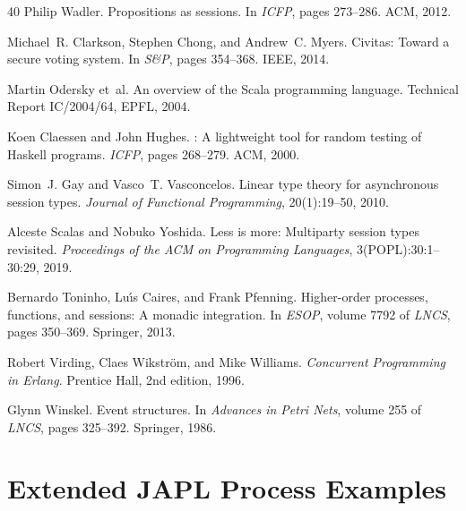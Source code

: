 \documentclass[11pt,a4paper]{article}
\begin{document}
\begin{thebibliography}{40}
Philip Wadler.
\newblock Propositions as sessions.
\newblock In \emph{ICFP}, pages 273--286. ACM, 2012.

Michael~R. Clarkson, Stephen Chong, and Andrew~C. Myers.
\newblock Civitas: Toward a secure voting system.
\newblock In \emph{S\&P}, pages 354--368. IEEE, 2014.

Martin Odersky et~al.
\newblock An overview of the {Scala} programming language.
\newblock Technical Report IC/2004/64, EPFL, 2004.

Koen Claessen and John Hughes.
: A lightweight tool for random testing of {Haskell} programs.
\newblock \emph{ICFP}, pages 268--279. ACM, 2000.

Simon~J. Gay and Vasco~T. Vasconcelos.
\newblock Linear type theory for asynchronous session types.
\newblock \emph{Journal of Functional Programming}, 20(1):19--50, 2010.

Alceste Scalas and Nobuko Yoshida.
\newblock Less is more: Multiparty session types revisited.
\newblock \emph{Proceedings of the ACM on Programming Languages}, 3(POPL):30:1--30:29, 2019.

Bernardo Toninho, Lu{\'\i}s Caires, and Frank Pfenning.
\newblock Higher-order processes, functions, and sessions: A monadic integration.
\newblock In \emph{ESOP}, volume 7792 of \emph{LNCS}, pages 350--369. Springer, 2013.

Robert Virding, Claes Wikstr{\"o}m, and Mike Williams.
\newblock \emph{Concurrent Programming in Erlang}.
\newblock Prentice Hall, 2nd edition, 1996.

Glynn Winskel.
\newblock Event structures.
\newblock In \emph{Advances in Petri Nets}, volume 255 of \emph{LNCS}, pages 325--392. Springer, 1986.

\end{thebibliography}

\appendix

\section{Extended JAPL Process Examples}\label{app:examples}
\end{document}
